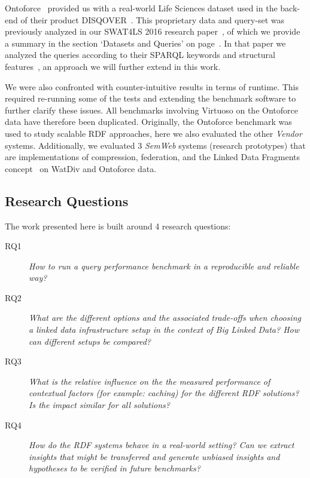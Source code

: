 Ontoforce~\cite{ontoforcewebsite} provided us with a real-world Life \mbox{Sciences} dataset used in the back-end of their product \mbox{DISQOVER~\cite{disqover}}. This proprietary data and query-set was previously analyzed in our SWAT4LS 2016 research paper~\cite{dewitte_swat4ls_2016}, of which we provide a summary in the section `Datasets and Queries' on page~\pageref{subsec:dataqueries}.
In that paper we analyzed the queries according to their SPARQL keywords and structural features~\cite{DBLP:journals/corr/abs-1103-5043}, an approach we will further extend in this work. 

We were also confronted with counter-intuitive results in terms of runtime. This required re-running some of the tests and extending the benchmark software to further clarify these issues. All benchmarks involving Virtuoso on the Ontoforce data have therefore been duplicated.
Originally, the Ontoforce benchmark was used to study scalable RDF approaches, here we also evaluated the other \emph{Vendor} systems. Additionally, we evaluated 3 \emph{SemWeb} systems (research prototypes) that are implementations of compression, federation, and the Linked Data Fragments concept~\cite{DBLP:conf/semweb/VerborghHMHVSCCMW14} on WatDiv and Ontoforce data.

\subsection{Research Questions}

The work presented here is built around 4 research questions:

\begin{description}
\item[RQ1] \emph{How to run a query performance benchmark in a reproducible and reliable way?}
\item[RQ2] \emph{What are the different options and the associated trade-offs when choosing a linked data infrastructure setup in the context of Big Linked Data? How can different setups be compared?}
\item[RQ3] \emph{What is the relative influence on the the measured performance of contextual factors (for example: caching) for the different RDF solutions? Is the impact similar for all solutions?}
\item[RQ4] \emph{How do the RDF systems behave in a real-world setting? Can we extract insights that might be transferred and generate unbiased insights and hypotheses to be verified in future benchmarks?}
\end{description} 

